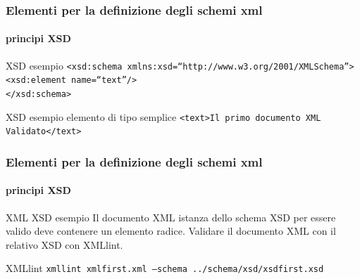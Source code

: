 \begin{frame}
	\frametitle{Elementi per la definizione degli schemi xml}
	\framesubtitle{principi XSD}
	\addtocounter{nframe}{1}




	\begin{block}{XSD esempio}
		\texttt{<xsd:schema xmlns:xsd=``http://www.w3.org/2001/XMLSchema''>}
		\\\texttt{<xsd:element name=``text''/>}
		\\\texttt{</xsd:schema>}
	\end{block}

	\begin{block}{XSD esempio elemento di tipo semplice}
		\texttt{<text>Il primo documento XML Validato</text>}
	\end{block}



\end{frame}

\begin{frame}
	\frametitle{Elementi per la definizione degli schemi xml}
	\framesubtitle{principi XSD}
	\addtocounter{nframe}{1}

	\begin{block}{XML XSD esempio}
		Il documento XML istanza dello schema XSD per essere valido deve contenere un elemento radice.
		Validare il documento XML con il relativo XSD con XMLlint.

	\end{block}

	\begin{block}{XMLlint}
		\texttt{xmllint xmlfirst.xml --schema ../schema/xsd/xsdfirst.xsd}
	\end{block}


\end{frame}

